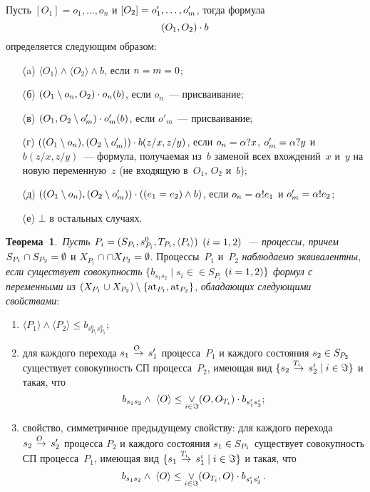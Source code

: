 \begin{multicols}{2}
\begin{enumerate}[1.]
Пусть $[O_1]=o_1,\ldots, o_n$ и
$[O_2]\hm=o'_1,\ldots, o'_m$, тогда
формула
\begin{equation}
\label{fgvfdsgdsfgdsfgd}
(O_1,O_2) \cdot b
\end{equation}
определяется следующим образом:
\begin{itemize}
\item[(a)] $\langle{O_1}\rangle\wedge \langle{O_2}\rangle\wedge b$, если $n\hm=m\hm=0$;
\item[(б)] $(O_1\setminus o_n, O_2) \cdot o_n(b)$, если
$o_n$~--- присваивание;
\item[(в)] $(O_1, O_2\setminus o'_m) \cdot o'_m(b)$, если
$o'_m$~--- присваивание;
\item[(г)] $((O_1\setminus o_n), (O_2\setminus o'_m)) \cdot b(z/x,z/y)$,
если $o_n\hm=\alpha?x$, $o'_m\hm=\alpha?y$ и
$b(z/x,z/y)$~--- формула, получаемая из~$b$ заменой всех вхождений~$x$ и~$y$ на новую
переменную~$z$ (не входящую в~$O_1$, $O_2$ и~$b$);
\item[(д)] $((O_1\setminus o_n), (O_2\setminus o'_m)) \cdot ((e_1=e_2)\wedge b)$,
если $o_n\hm=\alpha!e_1$ и $o'_m\hm=\alpha!e_2$;
\item[(е)] $\bot$ в  остальных случаях.
\end{itemize}
\end{enumerate}


\noindent
\textbf{Теорема~1}.\
\textit{Пусть $P_i\hm=(S_{P_i}, s^0_{P_i}, T_{P_i}, \langle{P_i}\rangle)$
$(i\hm=1,2)$~--- процессы, причем}
$S_{P_1} \cap S_{P_2} \hm= \emptyset$
и $X_{P_1} \cap$\linebreak $\cap X_{P_2} \hm= \emptyset$.
Процессы~$P_1$ и~$P_2$
\textit{наблюдаемо эквивалентны, если существует совокупность}
$\{b_{s_1s_2}\mid s_i\in$\linebreak $\in S_{P_i}$ $(i\hm=1,2)\}$
\textit{формул с переменными из}
$(X_{P_1}\hm\cup X_{P_2})\setminus\{\mathrm{at}_{P_1}, \mathrm{at}_{P_2}\}$,
\textit{обладающих следующими свойствами}:
\begin{enumerate}[($i$)]
\item $\langle{P_1}\rangle\wedge \langle{P_2}\rangle\leq b_{s^0_{P_1}s^0_{P_2}}$;
\item для  каждого перехода $s_1\;\mathop{\to}\limits^{\!\!\!O}\;s'_1$    процесса~$P_1$ и
каждого состояния $s_2\hm\in S_{P_2}$    существует  совокупность СП процесса~$P_2$,
имеющая вид $\{s_2\;\mathop{\to}\limits^{\!\!\!T_i}\;s_2^i\mid i\in\Im\}$
и такая, что
$$
b_{s_1s_2} \wedge \; \langle{O}\rangle \leq
\mathop{\vee}\limits_{i\in\Im} (O, O_{T_i}) \cdot b_{s'_1s^{i}_2};
$$
\item свойство, симметричное предыдущему свойству:
для  каждого перехода $s_2\;\mathop{\to}\limits^{\!\!\!O}\;s'_2$
   процесса $P_2$ и каждого состояния $s_1\hm\in S_{P_1}$
   существует    совокупность    СП процесса~$P_1$, имеющая вид
$\{s_1\ra{T_i}s_1^i\mid i\hm\in\Im\}$ и такая, что
$$
b_{s_1s_2} \wedge \; \langle{O}\rangle \leq
\mathop{\vee}\limits_{i\in\Im} (O_{T_i}, O) \cdot b_{s^{i}_1s'_2}\,.
$$
\end{enumerate}


\end{multicols}
